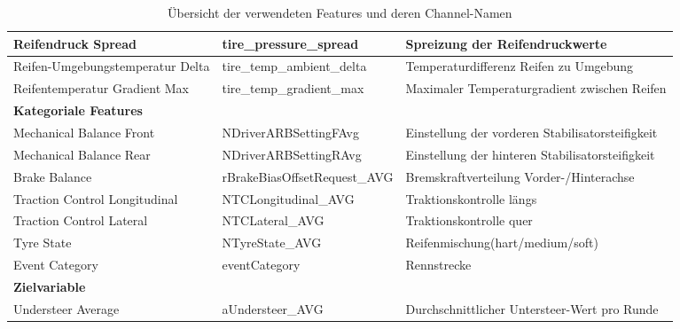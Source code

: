 \begin{table}[H]
\begin{tabular}{|p{4cm}|p{4.5cm}|p{6cm}|}
    Reifendruck Spread & tire\_pressure\_spread & Spreizung der Reifendruckwerte \\
    \hline
    Reifen-Umgebungstemperatur Delta & tire\_temp\_ambient\_delta & Temperaturdifferenz Reifen zu Umgebung \\
    \hline
    Reifentemperatur Gradient Max & tire\_temp\_gradient\_max & Maximaler Temperaturgradient zwischen Reifen \\
    \hline
    \multicolumn{3}{|l|}{\textbf{Kategoriale Features}} \\
    \hline
    Mechanical Balance Front & NDriverARBSettingFAvg & Einstellung der vorderen Stabilisatorsteifigkeit \\
    \hline
    Mechanical Balance Rear & NDriverARBSettingRAvg & Einstellung der hinteren Stabilisatorsteifigkeit \\
    \hline
    Brake Balance & rBrakeBiasOffsetRequest\_AVG & Bremskraftverteilung Vorder-/Hinterachse \\
    \hline
    Traction Control Longitudinal & NTCLongitudinal\_AVG & Traktionskontrolle längs \\
    \hline
    Traction Control Lateral & NTCLateral\_AVG & Traktionskontrolle quer \\
    \hline
    Tyre State & NTyreState\_AVG & Reifenmischung(hart/medium/soft) \\
    \hline
    Event Category & eventCategory & Rennstrecke \\
    \hline
    \multicolumn{3}{|l|}{\textbf{Zielvariable}} \\
    \hline
    Understeer Average & aUndersteer\_AVG & Durchschnittlicher Untersteer-Wert pro Runde \\
    \hline
  \end{tabular}
  \caption{Übersicht der verwendeten Features und deren Channel-Namen}
  \label{tab:features_channels}
\end{table}